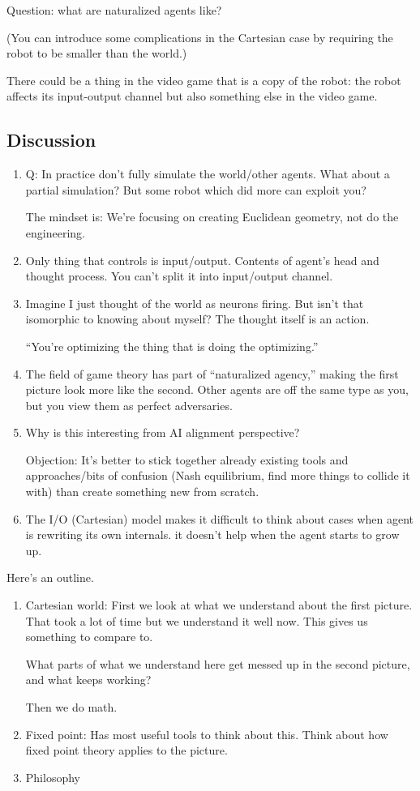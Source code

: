 \documentclass[11pt]{article}
\begin{document}
Question: what are naturalized agents like?

(You can introduce some complications in the Cartesian case by requiring the robot to be smaller than the world.)

There could be a thing in the video game that is a copy of the robot: the robot affects its input-output channel but also something else in the video game.

\subsection{Discussion}

\begin{enumerate}
\item
Q: In practice don't fully simulate the world/other agents. What about a partial simulation? But some robot which did more can exploit you?

The mindset is: We're focusing on creating Euclidean geometry, not do the engineering.
\item
Only thing that controls is input/output. Contents of agent's head and thought process. You can't split it into input/output channel.
\item
Imagine I just thought of the world as neurons firing.  But isn't that isomorphic to knowing about myself?  The thought itself is an action.

``You're optimizing the thing that is doing the optimizing.''
\item
The field of game theory has part of ``naturalized agency,'' making the first picture look more like the second. Other agents are off the same type as you, but you view them as perfect adversaries. 
\item
Why is this interesting from AI alignment perspective?

Objection: It's better to stick together already existing tools and approaches/bits of confusion (Nash equilibrium, find more things to collide it with) than create something new from scratch.
\item
The I/O (Cartesian) model makes it difficult to think about cases when agent is rewriting its own internals. it doesn't help when the agent starts to grow up.
\end{enumerate}
Here's an outline.
\begin{enumerate}
\item
Cartesian world: 
First we look at what we understand about the first picture. That took a lot of time but we understand it well now. This gives us something to compare to.

What parts of what we understand here get messed up in the second picture, and what keeps working?

Then we do math. 
\item
Fixed point: Has most useful tools to think about this. Think about how fixed point theory applies to the picture.
\item
Philosophy
\end{enumerate}
\end{document}
